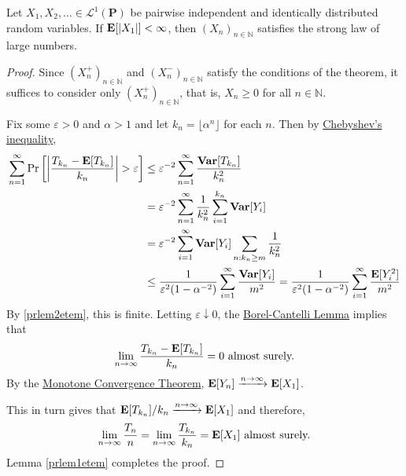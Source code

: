\begin{ftheo}
\label{etemadi sLLN}
    Let $X_1,X_2,\ldots\in\mathcal{L}^1(\textbf{P})$ be pairwise independent and identically distributed random variables. If $\textbf{E}[|X_1|]<\infty$, then $(X_n)_{n\in\mathbb{N}}$ satisfies the strong law of large numbers.
\end{ftheo}
\begin{proof}
    Since $(X_n^+)_{n\in\mathbb{N}}$ and $(X_n^-)_{n\in\mathbb{N}}$ satisfy the conditions of the theorem, it suffices to consider only $(X_n^+)_{n\in\mathbb{N}}$, that is, $X_n\geq 0$ for all $n\in\mathbb{N}$.
    
    Fix some $\varepsilon>0$ and $\alpha>1$ and let $k_n=\lfloor\alpha^n\rfloor$ for each $n$. Then by \hyperref[chebyshev inequality]{Chebyshev's inequality},
    \begin{align*}
        \sum_{n=1}^\infty \Pr\left[\left|\frac{T_{k_n}-\expec[T_{k_n}]}{k_n}\right|>\varepsilon\right] &\leq \varepsilon^{-2} \sum_{n=1}^\infty \frac{\Var[T_{k_n}]}{k_n^2} \\
        &= \varepsilon^{-2} \sum_{n=1}^\infty \frac{1}{k_n^2}\sum_{i=1}^{k_n} \Var[Y_i] \\
        &= \varepsilon^{-2} \sum_{i=1}^\infty \Var[Y_i] \sum_{n:k_n\geq m} \frac{1}{k_n^2} \\
        &\leq \frac{1}{\varepsilon^2(1-\alpha^{-2})} \sum_{i=1}^\infty \frac{\Var[Y_i]}{m^2} = \frac{1}{\varepsilon^2(1-\alpha^{-2})} \sum_{i=1}^\infty \frac{\expec[Y_i^2]}{m^2}
    \end{align*}
    By \cref{prlem2etem}, this is finite. Letting $\varepsilon\downarrow 0$, the \hyperref[borelCantelliLemma]{Borel-Cantelli Lemma} implies that
    $$\lim_{n\to\infty} \frac{T_{k_n} - \textbf{E}[T_{k_n}]}{k_n}=0\text{ almost surely.}$$
    By the \hyperref[Monotone Convergence Theorem]{Monotone Convergence Theorem}, $\textbf{E}[Y_n]\xrightarrow{n\to\infty}\textbf{E}[X_1]$.
    
    This in turn gives that $\textbf{E}[T_{k_n}]/k_n\xrightarrow{n\to\infty}\textbf{E}[X_1]$ and therefore, 
    $$\lim_{n\to\infty}\frac{T_{n}}{n}=\lim_{n\to\infty}\frac{T_{k_n}}{k_n}=\textbf{E}[X_1]\text{ almost surely.}$$
    Lemma \ref{prlem1etem} completes the proof.
\end{proof}

\clearpage